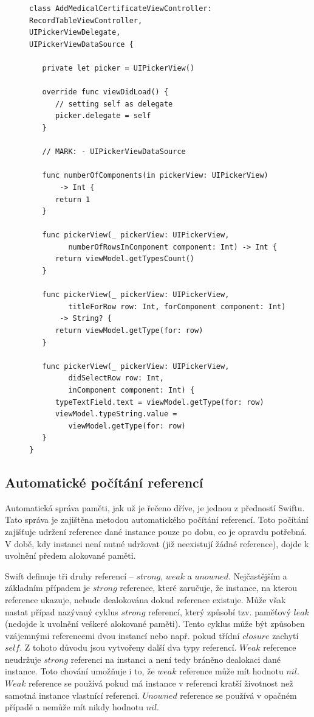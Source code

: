 \documentclass[thesis=M,czech]{FITthesis}[2012/06/26]
\begin{document}
\begin{figure}
\begin{minipage}{\linewidth}
\begin{lstlisting}[caption={Implementace protokolu},label={lst:pickerdelegate}]
class AddMedicalCertificateViewController: 
RecordTableViewController, 
UIPickerViewDelegate, 
UIPickerViewDataSource {

   private let picker = UIPickerView()

   override func viewDidLoad() {
      // setting self as delegate
      picker.delegate = self
   }

   // MARK: - UIPickerViewDataSource

   func numberOfComponents(in pickerView: UIPickerView) 
       -> Int {
      return 1
   }

   func pickerView(_ pickerView: UIPickerView, 
         numberOfRowsInComponent component: Int) -> Int {
      return viewModel.getTypesCount()
   }

   func pickerView(_ pickerView: UIPickerView, 
         titleForRow row: Int, forComponent component: Int)
       -> String? {
      return viewModel.getType(for: row)
   }

   func pickerView(_ pickerView: UIPickerView, 
         didSelectRow row: Int, 
         inComponent component: Int) {
      typeTextField.text = viewModel.getType(for: row)
      viewModel.typeString.value = 
         viewModel.getType(for: row)
   }
}
\end{lstlisting}
\end{minipage}
\end{figure}	
	
\subsection{Automatické počítání referencí}
Automatická správa paměti, jak už je řečeno dříve, je jednou z předností Swiftu. Tato správa je zajištěna metodou automatického počítání referencí. Toto počítání zajišťuje udržení reference dané instance pouze po dobu, co je opravdu potřebná. V době, kdy instanci není nutné udržovat (již neexistují žádné reference), dojde k uvolnění předem alokované paměti.

Swift definuje tři druhy referencí -- $strong$, $weak$ a $unowned$. Nejčastějším a základním případem je $strong$ reference, které zaručuje, že instance, na kterou reference ukazuje, nebude dealokována dokud reference existuje. Může však nastat případ nazývaný cyklus $strong$ referencí, který způsobí tzv. paměťový $leak$ (nedojde k uvolnění veškeré alokované paměti). Tento cyklus může být způsoben vzájemnými referencemi dvou instancí nebo např. pokud třídní $closure$ zachytí $self$. Z tohoto důvodu jsou vytvořeny další dva typy referencí. $Weak$ reference neudržuje $strong$ referenci na instanci a není tedy bráněno dealokaci dané instance. Toto chování umožňuje i to, že $weak$ reference může mít hodnotu $nil$. $Weak$ reference se používá pokud má instance v referenci kratší životnost než samotná instance vlastnící referenci. $Unowned$ reference se používá v opačném případě a nemůže mít nikdy hodnotu $nil$. \cite{devMemory}
\end{document}
